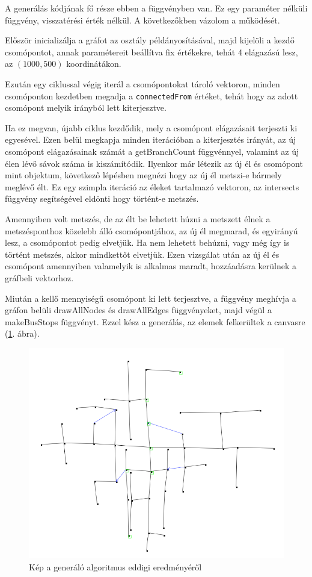 A generálás kódjának fő része ebben a függvényben van. Ez egy paraméter nélküli függvény, visszatérési érték nélkül. A következőkben vázolom a működését. 

Először inicializálja a gráfot az osztály példányosításával, majd kijelöli a kezdő csomópontot, annak paramétereit beállítva fix értékekre, tehát 4 elágazású lesz, az $(1000, 500)$ koordinátákon. 

Ezután egy ciklussal végig iterál a csomópontokat tároló vektoron, minden csomóponton kezdetben megadja a \texttt{connectedFrom} értéket, tehát hogy az adott csomópont melyik irányból lett kiterjesztve. 

Ha ez megvan, újabb ciklus kezdődik, mely a csomópont elágazásait terjeszti ki egyesével. Ezen belül megkapja minden iterációban a kiterjesztés irányát, az új csomópont elágazásainak számát a getBranchCount függvénnyel, valamint az új élen lévő sávok száma is kiszámítódik. Ilyenkor már létezik az új él és csomópont mint objektum, következő lépésben megnézi hogy az új él metszi-e bármely meglévő élt. Ez egy szimpla iteráció az éleket tartalmazó vektoron, az intersects függvény segítségével eldönti hogy történt-e metszés.

Amennyiben volt metszés, de az élt be lehetett húzni a metszett élnek a metszésponthoz közelebb álló csomópontjához, az új él megmarad, és egyirányú lesz, a csomópontot pedig elvetjük. Ha nem lehetett behúzni, vagy még így is történt metszés, akkor mindkettőt elvetjük. Ezen vizsgálat után az új él és csomópont amennyiben valamelyik is alkalmas maradt, hozzáadásra kerülnek a gráfbeli vektorhoz.

Miután a kellő mennyiségű csomópont ki lett terjesztve, a függvény meghívja a gráfon belüli drawAllNodes és drawAllEdges függvényeket, majd végül a makeBusStops függvényt. Ezzel kész a generálás, az elemek felkerültek a canvasre (\ref{fig:graph}. ábra).

\begin{figure}[H]
\includegraphics[width=\linewidth]{graph.png}
\caption{Kép a generáló algoritmus eddigi eredményéről}
\label{fig:graph}
\end{figure}


